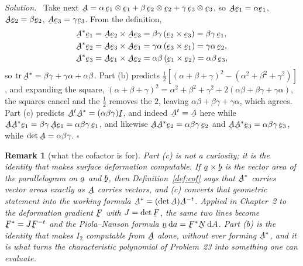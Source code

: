 \documentclass[17pt,a4paper]{extreport}
\DeclareRobustCommand{\vek}[1]{\underaccent{\tilde}{#1}}
\newcommand{\tr}{\operatorname{tr}}
\newcommand{\I}{\vek{I}}
\newcommand{\ba}{\vek{a}}
\newcommand{\bb}{\vek{b}}
\newcommand{\be}{\vek{e}}
\newcommand{\bn}{\vek{n}}
\newcommand{\bA}{\vek{A}}
\newcommand{\bF}{\vek{F}}
\newcommand{\bN}{\vek{N}}
\newcommand{\dl}{\mathrm{d}}
\theoremstyle{scplain}
\theoremstyle{scdefn}
\newtheorem{remark}[theorem]{Remark}
\theoremstyle{scplain}
\newenvironment{solution}
 {\par\smallskip\noindent\textit{Solution.}\ }
 {\hfill$\square$\par\medskip}
\begin{document}
\begin{solution}
Take next $\bA=\alpha\,\be_{1}\otimes\be_{1}+\beta\,\be_{2}\otimes\be_{2}
+\gamma\,\be_{3}\otimes\be_{3}$, so $\bA\be_{1}=\alpha\be_{1}$,
$\bA\be_{2}=\beta\be_{2}$, $\bA\be_{3}=\gamma\be_{3}$. From the definition,
\[
\begin{aligned}
   \bA^{*}\be_{1}&=\bA\be_{2}\times\bA\be_{3}
    =\beta\gamma\,(\be_{2}\times\be_{3})=\beta\gamma\,\be_{1},\\
   \bA^{*}\be_{2}&=\bA\be_{3}\times\bA\be_{1}
    =\gamma\alpha\,(\be_{3}\times\be_{1})=\gamma\alpha\,\be_{2},\\
   \bA^{*}\be_{3}&=\bA\be_{1}\times\bA\be_{2}
    =\alpha\beta\,(\be_{1}\times\be_{2})=\alpha\beta\,\be_{3},
\end{aligned}
\]
so $\tr\bA^{*}=\beta\gamma+\gamma\alpha+\alpha\beta$. Part (b) predicts
$\tfrac12[(\alpha+\beta+\gamma)^{2}-(\alpha^{2}+\beta^{2}+\gamma^{2})]$, and
expanding the square,
$(\alpha+\beta+\gamma)^{2}=\alpha^{2}+\beta^{2}+\gamma^{2}
+2(\alpha\beta+\beta\gamma+\gamma\alpha)$, the squares cancel and the
$\tfrac12$ removes the $2$, leaving
$\alpha\beta+\beta\gamma+\gamma\alpha$, which agrees. Part (c) predicts
$\bA^{t}\bA^{*}=(\alpha\beta\gamma)\I$, and indeed $\bA^{t}=\bA$ here while
$\bA\bA^{*}\be_{1}=\beta\gamma\,\bA\be_{1}=\alpha\beta\gamma\,\be_{1}$, and
likewise $\bA\bA^{*}\be_{2}=\alpha\beta\gamma\,\be_{2}$ and
$\bA\bA^{*}\be_{3}=\alpha\beta\gamma\,\be_{3}$, while
$\det\bA=\alpha\beta\gamma$.
\end{solution}

\begin{remark}[what the cofactor is for]\label{rem:cofuse}
Part (c) is not a curiosity; it is the identity that makes surface
deformation computable. If $\ba\times\bb$ is the vector area of the
parallelogram on $\ba$ and $\bb$, then Definition~\ref{def:cof} says that
$\bA^{*}$ carries vector areas exactly as $\bA$ carries vectors, and (c)
converts that geometric statement into the working formula
$\bA^{*}=(\det\bA)\bA^{-t}$. Applied in Chapter~2 to the deformation
gradient $\bF$ with $J=\det\bF$, the same two lines become
$\bF^{*}=J\bF^{-t}$ and the Piola--Nanson formula
$\bn\,\dl a=\bF^{*}\bN\,\dl A$. Part (b) is the identity that makes
$I_{2}$ computable from $\bA$ alone, without ever forming $\bA^{*}$, and it
is what turns the characteristic polynomial of Problem~23 into something
one can evaluate.
\end{remark}
\end{document}
